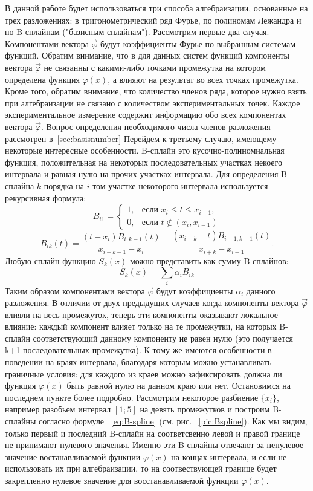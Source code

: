 В данной работе будет использоваться три способа алгебраизации, основанные на трех разложениях: в тригонометрический ряд Фурье, по полиномам Лежандра и по B-сплайнам ("базисным сплайнам"). 
Рассмотрим первые два случая. Компонентами вектора $\vec{\varphi}$ будут коэффициенты Фурье по выбранным системам функций. Обратим внимание, что в для данных систем функций компоненты вектора $\vec{\varphi}$ не связанны с какими-либо точками промежутка на котором определена функция $\varphi(x)$,  а влияют на результат во всех точках промежутка. Кроме того, обратим внимание, что количество членов ряда, которое нужно взять при алгебраизации не связано с количеством экспериментальных точек. Каждое экспериментальное измерение содержит информацию обо всех компонентах вектора $\vec{\varphi}$. Вопрос определения необходимого числа членов разложения рассмотрен в~\ref{sec:basisnumber}
Перейдем к третьему случаю, имеющему некоторые интересные особенности. B-сплайн это кусочно-полиномиальная функция, положительная на некоторых последовательных участках  некоего интервала и равная нулю на прочих участках интервала. Для определения B-сплайна $k$-порядка на $i$-том участке некоторого интервала используется рекурсивная формула:
\begin{equation}
B_{i1} = 
\begin{cases}
1, &\text{если $x_i \leq t \leq x_{i-1},$}\\
0, &\text{если $t \notin (x_i, x_{i-1})$}
\end{cases}
\label{eq:B-spline}
\end{equation}
$$ B_{ik} (t) = \frac{(t-x_i)B_{i,k-1}(t)}{x_{i+k-1} - x_i} - \frac{(x_{i+k}-t)B_{i+1,k-1}(t)}{x_{i+k} - x_{i+1}} .$$
Любую сплайн функцию $S_k(x)$ можно представить как сумму B-сплайнов:
$$
S_k(x) = \sum \limits_i \alpha_i B_{ik}
$$
Таким образом компонентами вектора $\vec{\varphi}$ будут коэффициенты $\alpha_i$ данного разложения. В отличии от двух предыдущих случаев когда компоненты вектора $\vec{\varphi}$ влияли на весь промежуток, теперь эти компоненты оказывают локальное влияние: каждый компонент влияет только на те промежутки, на которых B-сплайн соответствующий данному компоненту не равен нулю (это получается k+1 последовательных промежутка). К тому же имеются особенности в поведении на краях интервала, благодаря которым можно устанавливать граничные условия: для каждого из краев можно зафиксировать должна ли функция $\varphi(x)$ быть равной нулю на данном краю или нет. Остановимся на последнем пункте более подробно. Рассмотрим некоторое разбиение $\{x_i\}$, например разобьем интервал $[1;5]$ на девять промежутков и построим B-сплайны согласно формуле ~\ref{eq:B-spline} (см. рис. ~\ref{pic:Bspline}). Как мы видим, только первый и последний B-сплайн на соответсвенно левой и правой границе не принимают нулевого значения. Именно эти B-сплайны отвечают за ненулевое значение востанавливаемой функции  $\varphi(x)$ на концах интервала, и если не использовать их при алгебраизации, то на соотвествующей границе будет закрепленно нулевое значение для восстанавливаемой функции $\varphi(x)$.

